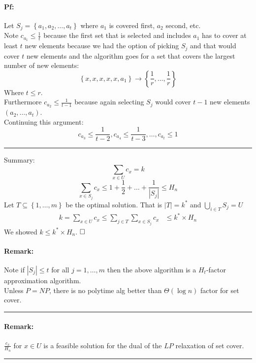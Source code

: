 \documentclass[12 pt]{article}
\begin{document}
          \paragraph{Pf:} Let $S_j = \left\{a_1, a_2, \ldots,
            a_t\right\}$ where $a_1$ is covered first, $a_2$ second,
          etc.
          \\ Note $c_{a_1}\leq \frac{1}{t}$ because the first set that
          is selected and includes $a_1$ has to cover at least $t$ new
          elements because we had the option of picking $S_j$ and that
          would cover $t$ new elements and the algorithm goes for a
          set that covers the largest number of new elements:
          $$\left\{x,x,x,x,x,a_1\right\} \to
          \left\{\frac{1}{r},\ldots,\frac{1}{r}\right\}$$ Where $t
          \leq r$.
          \\ Furthermore $c_{a_2}\leq \frac{1}{t-1}$ because again
          selecting $S_j$ would cover $t-1$ new elements $(a_2,\ldots,
          a_t)$.
          \\ Continuing this argument:
          $$c_{a_3} \leq \frac{1}{t-2}, c_{a_4} \leq \frac{1}{t-3},
          \ldots, c_{a_t} \leq 1$$
          \noindent \rule{\textwidth}{0.5pt}
          Summary: $$\sum_{x \in U}c_x = k$$
          $$\sum_{x \in S_j}c_x \leq 1 +
          \frac{1}{2}+\ldots+\frac{1}{\left|S_j\right|}\leq H_n$$
          Let $T \subseteq \left\{1,\ldots,m\right\}$ be the optimal
          solution. That is $\left|T\right|=k^*$ and $\bigcup_{i\in
            T}S_j = U$
          \begin{align*}
            k = \sum_{x \in U}c_x \leq \sum_{j\in T}\sum_{x \in S_j}c_x & \leq k^* \times H_n
          \end{align*}
          We showed $k \leq k^* \times H_n$. $\hfill \square$
          \paragraph{Remark:} Note if $\left|S_j\right|\leq t$ for all
          $j = 1,\ldots, m$ then the above algorithm is a $H_t$-factor
          approximation algorithm.
          \\ Unless $P=NP$, there is no polytime alg better than
          $\Theta(\log n)$ factor for set cover.
          \\ \noindent \rule{\textwidth}{0.5pt}
          \paragraph{Remark:} $\frac{c_x}{H_n}$ for $x \in U$ is a
          feasible solution for the dual of the $LP$ relaxation of set
          cover.
          \\ \noindent \rule{\textwidth}{0.5pt}
\end{document}
